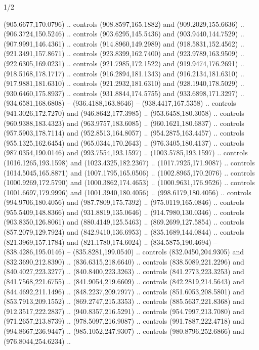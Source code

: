 \begin{flagdescription}{1/2}
\begin{scope}[shift={(2*\flaglength/3-0.25*\rb,0.51333\flagwidth)},scale=0.001715\flagwidth*\stretchfactor]
\begin{scope}[y=-1pt, x=1pt,cm={{1.04354,0.0,0.0,1.01818,(-827,-297)}}]
\begin{scope}[draw=black,line width=0.015\flagwidth]
\begin{scope}[fill=gold]
  (905.6677,170.0796) .. controls (908.8597,165.1882) and (909.2029,155.6636) ..
  (906.3724,150.5246) .. controls (903.6295,145.5436) and (903.9440,144.7529) ..
  (907.9991,146.4361) .. controls (914.8960,149.2989) and (918.5831,152.4562) ..
  (921.3491,157.8671) .. controls (923.8399,162.7400) and (923.9789,163.9509) ..
  (922.6305,169.0231) .. controls (921.7985,172.1522) and (919.9474,176.2691) ..
  (918.5168,178.1717) .. controls (916.2894,181.1343) and (916.2134,181.6310) ..
  (917.9881,181.6310) .. controls (921.2932,181.6310) and (928.1940,178.5029) ..
  (930.6460,175.8937) .. controls (931.8844,174.5755) and (933.6898,171.3297) ..
  (934.6581,168.6808) -- (936.4188,163.8646) -- (938.4417,167.5358) .. controls
  (941.3026,172.7270) and (946.8642,177.3985) .. (953.6458,180.3058) .. controls
  (960.9388,183.4323) and (963.9757,183.6085) .. (960.1621,180.6837) .. controls
  (957.5903,178.7114) and (952.8513,164.8057) .. (954.2875,163.4457) .. controls
  (955.1325,162.6454) and (965.0344,170.2643) .. (976.3405,180.4137) .. controls
  (987.0354,190.0146) and (993.7554,193.1597) .. (1003.5785,193.1597) ..
  controls (1016.1265,193.1598) and (1023.4325,182.2367) .. (1017.7925,171.9087)
  .. controls (1014.5045,165.8871) and (1007.1795,165.0506) ..
  (1002.8965,170.2076) .. controls (1000.9269,172.5790) and (1000.3862,174.4653)
  .. (1000.9631,176.9526) .. controls (1001.6697,179.9996) and
  (1001.3940,180.4056) .. (998.6179,180.4056) .. controls (994.9706,180.4056)
  and (987.7809,175.7392) .. (975.0119,165.0846) .. controls (955.5409,148.8366)
  and (931.8819,135.0646) .. (914.7980,130.0346) .. controls (903.8350,126.8061)
  and (880.4149,125.5463) .. (869.2699,127.5854) .. controls (857.2079,129.7924)
  and (842.9410,136.6953) .. (835.1689,144.0844) .. controls (821.3969,157.1784)
  and (821.1780,174.6024) .. (834.5875,190.4694) -- (838.4286,195.0146) --
  (835.8281,199.0540) .. controls (832.0450,204.9305) and (832.3690,212.8390) ..
  (836.6315,218.6640) .. controls (838.5089,221.2296) and (840.4027,223.3277) ..
  (840.8400,223.3263) .. controls (841.2773,223.3253) and (841.7568,221.6755) ..
  (841.9054,219.6609) .. controls (842.2819,214.5643) and (844.4692,211.1496) ..
  (848.2237,209.7977) .. controls (851.6053,208.5801) and (853.7913,209.1552) ..
  (869.2747,215.3353) .. controls (885.5637,221.8368) and (912.3517,222.2837) ..
  (940.8357,216.5291) .. controls (954.7997,213.7080) and (971.2657,213.8739) ..
  (978.5097,216.9087) .. controls (991.7887,222.4718) and (994.8667,236.9447) ..
  (985.1052,247.9307) .. controls (980.8796,252.6866) and (976.8044,254.6234) ..

\end{scope}
\end{scope}
\end{scope}
\end{scope}
\end{flagdescription}
